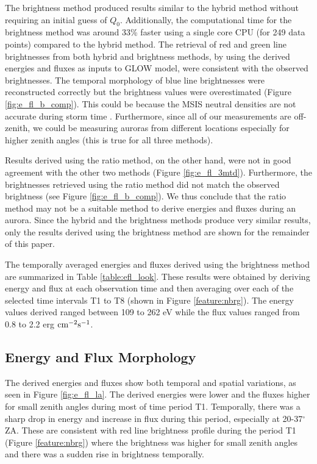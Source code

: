 The brightness method produced results similar to the hybrid method without requiring an initial guess of $Q_0$. Additionally, the computational time for the brightness method was around 33\% faster using a single core CPU (for 249 data points) compared to the hybrid method. The retrieval of red and green line brightnesses from both hybrid and brightness methods, by using the derived energies and fluxes as inputs to GLOW model, were consistent with the observed brightnesses. The temporal morphology of blue line brightnesses were reconstructed correctly but the brightness values were overestimated (Figure \ref{fig:e_fl_b_comp}). This could be because the MSIS neutral densities are not accurate during storm time \citep{fang_variations_2012}. Furthermore, since all of our measurements are off-zenith, we could be measuring auroras from different locations especially for higher zenith angles (this is true for all three methods).

Results derived using the ratio method, on the other hand, were not in good agreement with the other two methods (Figure \ref{fig:e_fl_3mtd}). Furthermore, the brightnesses retrieved using the ratio method did not match the observed brightness (see Figure \ref{fig:e_fl_b_comp}). We thus conclude that the ratio method may not be a suitable method to derive energies and fluxes during an aurora. Since the hybrid and the brightness methods produce very similar results, only the results derived using the brightness method are shown for the remainder of this paper.

The temporally averaged energies and fluxes derived using the brightness method are summarized in Table \ref{table:efl_look}. These results were obtained by deriving energy and flux at each observation time and then averaging over each of the selected time intervals T1 to T8 (shown in Figure \ref{feature:nbrg}). The energy values derived ranged between 109 to 262 eV while the flux values ranged from 0.8 to 2.2 erg $\rm cm^{-2} s^{-1}$.


\subsection{Energy and Flux Morphology}
\label{sec:emorph}
The derived energies and fluxes show both temporal and spatial variations, as seen in Figure \ref{fig:e_fl_la}. The derived energies were lower and the fluxes higher for small zenith angles during most of time period T1. Temporally, there was a sharp drop in energy and increase in flux during this period, especially at 20-37$^\circ$ ZA. These are consistent with red line brightness profile during the period T1 (Figure \ref{feature:nbrg}) where the brightness was higher for small zenith angles and there was a sudden rise in brightness temporally.

